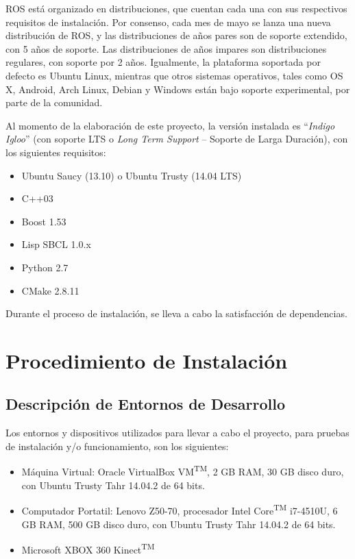 ROS está organizado en distribuciones, que cuentan cada una con sus respectivos requisitos de instalación. Por consenso, cada mes de mayo se lanza una nueva distribución de ROS, y las distribuciones de años pares son de soporte extendido, con 5 años de soporte. Las distribuciones de años impares son distribuciones regulares, con soporte por 2 años. Igualmente, la plataforma soportada por defecto es Ubuntu Linux, mientras que otros sistemas operativos, tales como OS X, Android, Arch Linux, Debian y Windows están bajo soporte experimental, por parte de la comunidad.

Al momento de la elaboración de este proyecto, la versión instalada es ``\textit{Indigo Igloo}'' (con soporte LTS o \textit{Long Term Support} -- Soporte de Larga Duración), con los siguientes requisitos:

\begin{itemize}
	\itemsep1pt \parskip1pt 
	\item Ubuntu Saucy (13.10) o Ubuntu Trusty (14.04 LTS)
	\item C++03
	\item Boost 1.53
	\item Lisp SBCL 1.0.x
	\item Python 2.7
	\item CMake 2.8.11 \cite{rosrequirements}
\end{itemize}

Durante el proceso de instalación, se lleva a cabo la satisfacción de dependencias.

\section{Procedimiento de Instalación}

\subsection{Descripción de Entornos de Desarrollo}

Los entornos y dispositivos utilizados para llevar a cabo el proyecto, para pruebas de instalación y/o funcionamiento, son los siguientes:

\begin{itemize}
	\item Máquina Virtual: Oracle \textregistered{} VirtualBox VM\textsuperscript{TM}, 2 GB RAM, 30 GB disco duro, con Ubuntu Trusty Tahr 14.04.2 de 64 bits.
	\item Computador Portatil: Lenovo \textregistered{} Z50-70, procesador Intel \textregistered{}  Core\textsuperscript{TM} i7-4510U, 6 GB RAM, 500 GB disco duro, con Ubuntu Trusty Tahr 14.04.2 de 64 bits.
	\item Microsoft \textregistered{}  XBOX 360 \textregistered{}  Kinect\textsuperscript{TM}
\end{itemize}


